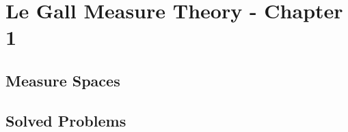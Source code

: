 \chapter{Le Gall Measure Theory - Chapter 1}



\section{Measure Spaces}


\section{Solved Problems}
